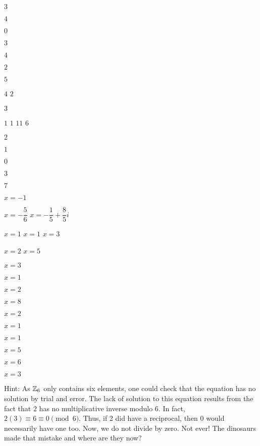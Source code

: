 \begin{enumerate}[!HW!, start=1]
\begin{multicols}{7}
\item $3$ %
\item $4$ %
\item $0$ %
\item $3$ %
\item $4$ %
\item $2$ %
\item $5$ %
\end{multicols}
\begin{multicols}{7}
\itemspade $4$ 
\itemspade $2$ 
\item $3$ %
\item $1$ %
\itemspade $1$ 
\itemspade $11$ 
\itemspade $6$ 
\end{multicols}
\begin{multicols}{6}
\item $2$ %
\item $1$ %
\item $0$ %
\item $3$ %
\item $7$ %
\item $x=-1$ %
\end{multicols}
\begin{multicols}{5}
\itemspade $x=-\dfrac{5}{6}$ \columnbreak
\itemspade $x=-\dfrac{1}{5} + \dfrac{8}{5}i$ \columnbreak
\item $x=1$\columnbreak %
\itemspade $x=1$ \columnbreak
\itemspade $x=3$
\end{multicols}
\begin{multicols}{7}
\itemspade $x=2$
\itemspade $x=5$
\item $x=3$  %
\item $x=1$  %
\item $x=2$  %
\item $x=8$  %
\item $x=2$  %
\end{multicols}
\begin{multicols}{7}
\item $x=1$  %
\item $x=1$  %
\item $x=5$ %
\item $x=6$ %
\item $x=3$ %
\end{multicols}


\itemspade 
Hint: As $\mathbb{Z}_6$ only contains six elements, one could check that the equation has no solution by trial and error. The lack of solution to this equation results from the fact that $2$ has no multiplicative inverse modulo 6. In fact, $2(3) \equiv 6 \equiv 0 \pmod 6$. Thus, if 2 did have a reciprocal, then $0$ would necessarily have one too. Now, we do not divide by zero. Not ever! The dinosaurs made that mistake and where are they now?
\end{enumerate}

\vspace{-15 pt}